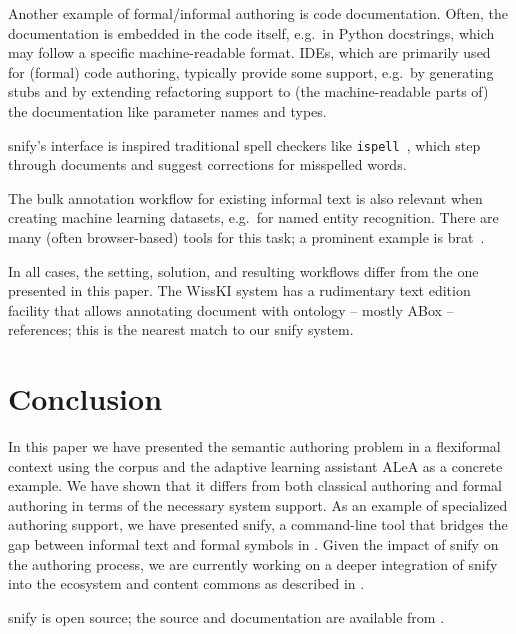 \documentclass[runningheads]{llncs}
\newcommand\ALeA{\textsf{ALeA}\xspace}
\newcommand\snify{\textsf{snify}\xspace}
\begin{document}
Another example of formal/informal authoring is code documentation.
Often, the documentation is embedded in the code itself,
e.g.\ in Python docstrings, which may follow a specific
machine-readable format.
IDEs, which are primarily used for (formal) code authoring,
typically provide some support, e.g.\ by generating stubs
and by extending refactoring support
to (the machine-readable parts of) the documentation
like parameter names and types.

\snify's interface is inspired traditional spell checkers
like \lstinline|ispell|~\cite{ispellman},
which step through documents and suggest corrections for misspelled words.

The bulk annotation workflow for existing informal text is also relevant when creating
machine learning datasets, e.g.\ for named entity recognition.  There are many (often
browser-based) tools for this task; a prominent example is
\textsf{brat}~\cite{brat:on}.

In all cases, the setting, solution, and resulting workflows differ from the one presented
in this paper. The WissKI system \cite{goerz2010adaptation} has a rudimentary text edition
facility that allows annotating document with ontology -- mostly ABox -- references; this
is the nearest match to our \snify system.

\section{Conclusion}\label{sec:conclusion}
In this paper we have presented the semantic authoring problem in a flexiformal context
using the \sTeX corpus and the adaptive learning assistant \ALeA as a concrete example. We
have shown that it differs from both classical authoring and formal authoring in terms of
the necessary system support. As an example of specialized authoring support, we have
presented \snify, a command-line tool that bridges the gap between informal text and
formal symbols in \sTeX.  Given the impact of \snify on the authoring process, we are
currently working on a deeper integration of \snify into the \sTeX ecosystem and content
commons as described in . 

\snify is open source; the source and documentation are available from
\cite{stextools:git}.
\end{document}
